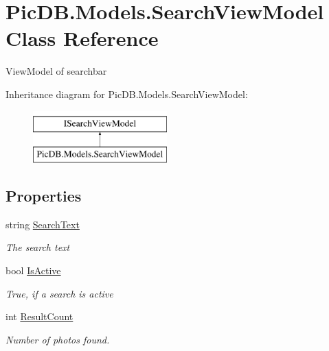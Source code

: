 \hypertarget{class_pic_d_b_1_1_models_1_1_search_view_model}{}\section{Pic\+D\+B.\+Models.\+Search\+View\+Model Class Reference}
\label{class_pic_d_b_1_1_models_1_1_search_view_model}


View\+Model of searchbar  


Inheritance diagram for Pic\+D\+B.\+Models.\+Search\+View\+Model\+:\begin{figure}[H]
\begin{center}
\leavevmode
\includegraphics[height=2.000000cm]{class_pic_d_b_1_1_models_1_1_search_view_model}
\end{center}
\end{figure}
\subsection*{Properties}
\begin{DoxyCompactItemize}
\item 
string \mbox{\hyperlink{class_pic_d_b_1_1_models_1_1_search_view_model_a0e382ec6015dd461d4b9daa3385eadf2}{Search\+Text}}
\begin{DoxyCompactList}\small\item\em The search text \end{DoxyCompactList}\item 
bool \mbox{\hyperlink{class_pic_d_b_1_1_models_1_1_search_view_model_a287ef077e059e4f07db1dc8f6a601366}{Is\+Active}}
\begin{DoxyCompactList}\small\item\em True, if a search is active \end{DoxyCompactList}\item 
int \mbox{\hyperlink{class_pic_d_b_1_1_models_1_1_search_view_model_a58a86878f702cf1bf1df500cd1c3c604}{Result\+Count}}
\begin{DoxyCompactList}\small\item\em Number of photos found. \end{DoxyCompactList}\end{DoxyCompactItemize}


